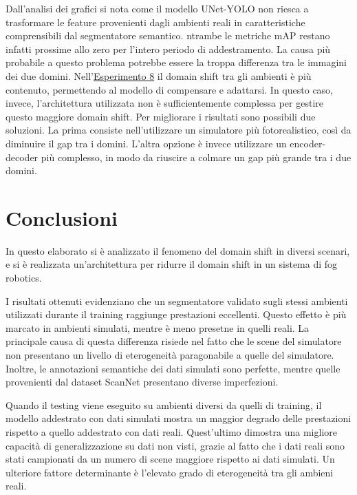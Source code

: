 \documentclass[12pt]{report}
\begin{document}
Dall'analisi dei grafici si nota come il modello UNet-YOLO non riesca a trasformare le feature provenienti dagli ambienti reali in caratteristiche comprensibili dal segmentatore semantico. ntrambe le metriche mAP restano infatti prossime allo zero per l'intero periodo di addestramento. La causa più probabile a questo problema potrebbe essere la troppa differenza tra le immagini dei due domini. Nell'\hyperref[sec:esperimento_8]{Esperimento 8} il domain shift tra gli ambienti è più contenuto, permettendo al modello di compensare e adattarsi. In questo caso, invece, l'architettura utilizzata non è sufficientemente complessa per gestire questo maggiore domain shift. Per migliorare i risultati sono possibili due soluzioni. La prima consiste nell'utilizzare un simulatore più fotorealistico, così da diminuire il gap tra i domini. L'altra opzione è invece utilizzare un encoder-decoder più complesso, in modo da riuscire a colmare un gap più grande tra i due domini.

\chapter{Conclusioni}
\label{chap:conclusioni}

In questo elaborato si è analizzato il fenomeno del domain shift in diversi scenari, e si è realizzata un'architettura per ridurre il domain shift in un sistema di fog robotics.

I risultati ottenuti evidenziano che un segmentatore validato sugli stessi ambienti utilizzati durante il training raggiunge prestazioni  eccellenti. Questo effetto è più marcato in ambienti simulati, mentre è meno presetne in quelli reali. La principale causa di questa differenza risiede nel fatto che le scene del simulatore non presentano un livello di eterogeneità paragonabile a quelle del simulatore. Inoltre, le annotazioni semantiche dei dati simulati sono perfette, mentre quelle provenienti dal dataset ScanNet presentano diverse imperfezioni.

Quando il testing viene eseguito su ambienti diversi da quelli di training, il modello addestrato con dati simulati mostra un maggior degrado delle prestazioni rispetto a quello addestrato con dati reali. Quest'ultimo dimostra una migliore capacità di generalizzazione su dati non visti, grazie al fatto che i dati reali sono stati campionati da un numero di scene maggiore rispetto ai dati simulati. Un ulteriore fattore determinante è l'elevato grado di eterogeneità tra gli ambieni reali.
\end{document}
